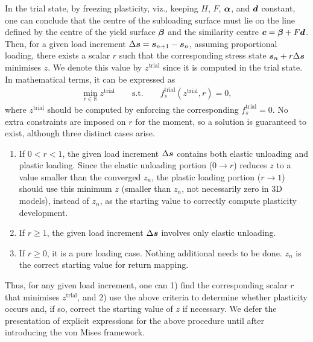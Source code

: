 In the trial state, by freezing plasticity, viz., keeping $H$, $F$, $\bm{\alpha}$, and $\bm{d}$ constant, one can conclude that the centre of the subloading surface must lie on the line defined by the centre of the yield surface $\bm{\beta}$ and the similarity centre $\bm{c}=\bm{\beta}+F\bm{d}$.
Then, for a given load increment $\Delta\bm{s}=\bm{s}_{n+1}-\bm{s}_n$, assuming proportional loading, there exists a scalar $r$ such that the corresponding stress state $\bm{s}_n+r\Delta\bm{s}$ minimises $z$.
We denote this value by $z^\text{trial}$ since it is computed in the trial state.
In mathematical terms, it can be expressed as
\begin{gather}
    \boxed{\min\limits_{r\in\mathbb{R}}z^\text{trial}\qquad\text{s.t.}\qquad{}f_s^\text{trial}\left(z^\text{trial},r\right)=0,}
\end{gather}
where $z^\text{trial}$ should be computed by enforcing the corresponding $f_s^\text{trial}=0$.
No extra constraints are imposed on $r$ for the moment, so a solution is guaranteed to exist, although three distinct cases arise.
\begin{enumerate}
    \item If $0<r<1$, the given load increment $\Delta\bm{s}$ contains both elastic unloading and plastic loading.
          Since the elastic unloading portion ($0\to{}r$) reduces $z$ to a value smaller than the converged $z_n$, the plastic loading portion ($r\to{}1$) should use this minimum $z$ (smaller than $z_n$, not necessarily zero in 3D models), instead of $z_n$, as the starting value to correctly compute plasticity development.
    \item If $r\geqslant1$, the given load increment $\Delta\bm{s}$ involves only elastic unloading.
    \item If $r\geqslant0$, it is a pure loading case.
    Nothing additional needs to be done.
    $z_n$ is the correct starting value for return mapping.
\end{enumerate}
Thus, for any given load increment, one can 1) find the corresponding scalar $r$ that minimises $z^\text{trial}$, and 2) use the above criteria to determine whether plasticity occurs and, if so, correct the starting value of $z$ if necessary.
We defer the presentation of explicit expressions for the above procedure until after introducing the von Mises framework.
